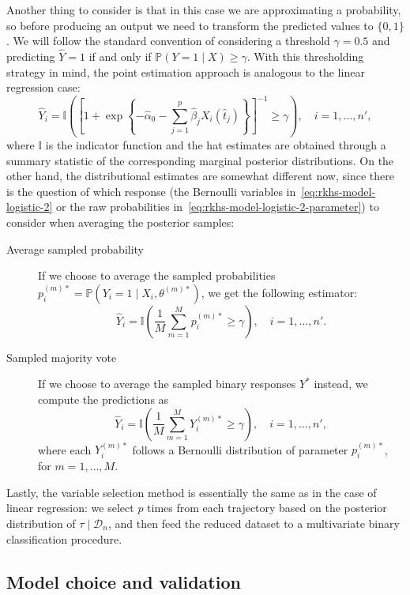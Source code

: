 \documentclass[ba]{imsart}
\numberwithin{equation}{section}
\theoremstyle{plain}
\begin{document}
Another thing to consider is that in this case we are approximating a probability, so before producing an output we need to transform the predicted values to \(\{0, 1\}\). We will follow the standard convention of considering a threshold \(\gamma = 0.5\) and predicting \(\hat Y=1\) if and only if \(\mathbb P(Y=1\mid X) \geq \gamma\). With this thresholding strategy in mind, the point estimation approach is analogous to the linear regression case:
\[
\hat Y_i = \mathbb I \left( \left[\displaystyle 1 + \exp\left\{-\hat\alpha_0 - \sum_{j=1}^p \hat\beta_j X_i(\hat t_j)\right\}\right]^{-1} \geq \gamma \right), \quad i=1,\dots,n',
\]
where \(\mathbb I\) is the indicator function and the hat estimates are obtained through a summary statistic of the corresponding marginal posterior distributions. On the other hand, the distributional estimates are somewhat different now, since there is the question of which response (the Bernoulli variables in~\eqref{eq:rkhs-model-logistic-2} or the raw probabilities in~\eqref{eq:rkhs-model-logistic-2-parameter}) to consider when averaging the posterior samples:
\begin{description}
  \item[Average sampled probability] If we choose to average the sampled probabilities \(p_i^{(m)*} = \mathbb P(Y_i =1 \mid X_i,\theta^{(m)*})\), we get the following estimator:
  \[
    \hat Y_i = \mathbb I\left(\frac{1}{M} \sum_{m=1}^M p_i^{(m)*} \geq \gamma\right), \quad i=1,\dots,n'.
  \]
  \item[Sampled majority vote] If we choose to average the sampled binary responses \(Y^*\) instead, we compute the predictions as
\[
  \hat Y_i = \mathbb I\left(\frac{1}{M} \sum_{m=1}^M Y_i^{(m)*} \geq \gamma\right), \quad i=1,\dots,n',
\]
where each \(Y_i^{(m)*}\) follows a Bernoulli distribution of parameter \(p_i^{(m)*}\), for \(m=1,\dots,M\).
\end{description}
Lastly, the variable selection method is essentially the same as in the case of linear regression: we select \(p\) times from each trajectory based on the posterior distribution of \(\tau\mid \mathcal D_n\), and then feed the reduced dataset to a multivariate binary classification procedure.

\subsection{Model choice and validation}\label{sec:model-choice}
\end{document}
